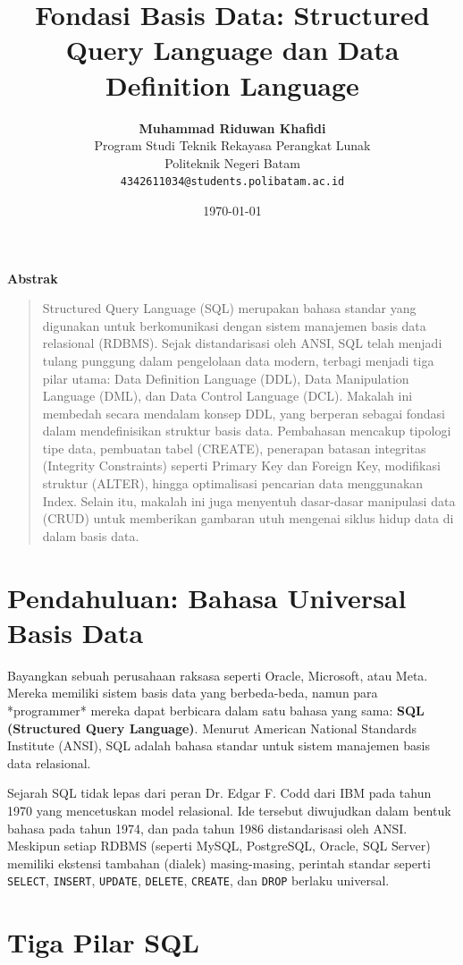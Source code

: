 \documentclass[11pt,a4paper]{article}
\title{\vspace{-1.5cm}\textbf{\sffamily\LARGE Fondasi Basis Data: Structured Query Language dan Data Definition Language}}
\author{
	\textbf{Muhammad Riduwan Khafidi} \\
	\small Program Studi Teknik Rekayasa Perangkat Lunak \\
	\small Politeknik Negeri Batam \\
	\small \texttt{4342611034@students.polibatam.ac.id}
}
\date{\small\today}
\renewenvironment{abstract}
{\small
	\begin{center}\textbf{\sffamily Abstrak}\end{center}
	\begin{quote}}
	{\end{quote}}
\begin{document}
\maketitle
\thispagestyle{empty}

\begin{abstract}
	Structured Query Language (SQL) merupakan bahasa standar yang digunakan untuk berkomunikasi dengan sistem manajemen basis data relasional (RDBMS). Sejak distandarisasi oleh ANSI, SQL telah menjadi tulang punggung dalam pengelolaan data modern, terbagi menjadi tiga pilar utama: Data Definition Language (DDL), Data Manipulation Language (DML), dan Data Control Language (DCL). Makalah ini membedah secara mendalam konsep DDL, yang berperan sebagai fondasi dalam mendefinisikan struktur basis data. Pembahasan mencakup tipologi tipe data, pembuatan tabel (CREATE), penerapan batasan integritas (Integrity Constraints) seperti Primary Key dan Foreign Key, modifikasi struktur (ALTER), hingga optimalisasi pencarian data menggunakan Index. Selain itu, makalah ini juga menyentuh dasar-dasar manipulasi data (CRUD) untuk memberikan gambaran utuh mengenai siklus hidup data di dalam basis data.
\end{abstract}

\section{Pendahuluan: Bahasa Universal Basis Data}

Bayangkan sebuah perusahaan raksasa seperti Oracle, Microsoft, atau Meta. Mereka memiliki sistem basis data yang berbeda-beda, namun para *programmer* mereka dapat berbicara dalam satu bahasa yang sama: \textbf{SQL (Structured Query Language)}. Menurut American National Standards Institute (ANSI), SQL adalah bahasa standar untuk sistem manajemen basis data relasional.

Sejarah SQL tidak lepas dari peran Dr. Edgar F. Codd dari IBM pada tahun 1970 yang mencetuskan model relasional. Ide tersebut diwujudkan dalam bentuk bahasa pada tahun 1974, dan pada tahun 1986 distandarisasi oleh ANSI. Meskipun setiap RDBMS (seperti MySQL, PostgreSQL, Oracle, SQL Server) memiliki ekstensi tambahan (dialek) masing-masing, perintah standar seperti \texttt{SELECT}, \texttt{INSERT}, \texttt{UPDATE}, \texttt{DELETE}, \texttt{CREATE}, dan \texttt{DROP} berlaku universal.

\section{Tiga Pilar SQL}
\end{document}
